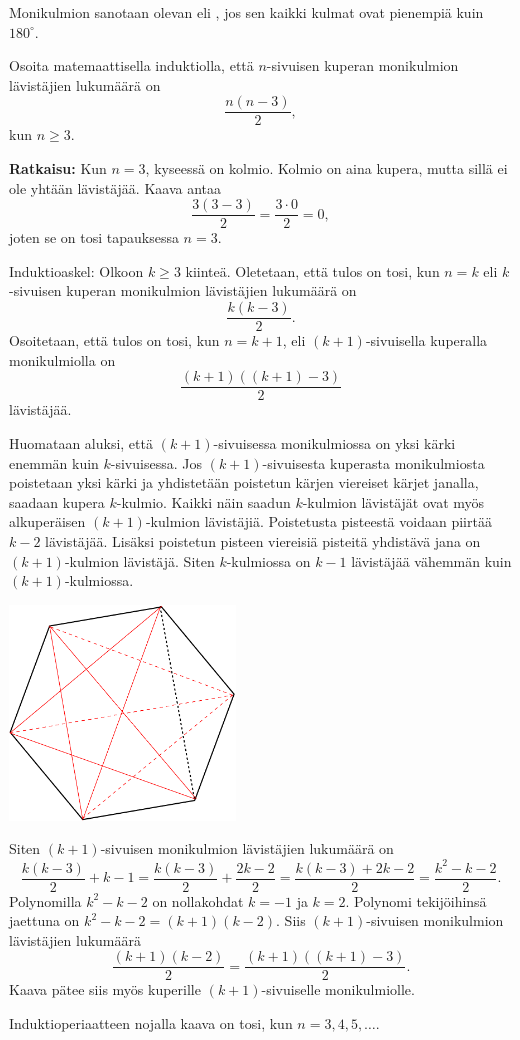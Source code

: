 \begin{esimerkki}
Monikulmion sanotaan olevan  eli , jos sen kaikki kulmat ovat pienempiä kuin $180^\circ$.

Osoita matemaattisella induktiolla, että $n$-sivuisen kuperan monikulmion lävistäjien
lukumäärä on
\[
\frac{n(n-3)}{2},
\]
kun $n\ge 3$.

{\bf Ratkaisu:}
Kun $n = 3$, kyseessä on kolmio. Kolmio on aina kupera, mutta sillä ei ole yhtään lävistäjää. Kaava antaa
\[
\frac{3(3-3)}{2}=\frac{3\cdot 0}{2} =0,
\]
joten se on tosi tapauksessa $n=3$.

Induktioaskel: Olkoon $k\ge 3$ kiinteä. Oletetaan, että tulos on tosi, kun $n=k$ eli $k$-sivuisen kuperan monikulmion lävistäjien lukumäärä on
\[
\frac{k(k-3)}{2}.
\]
Osoitetaan, että tulos on tosi, kun $n=k+1$, eli $(k+1)$-sivuisella kuperalla monikulmiolla on
\[
\frac{(k+1)((k+1)-3)}{2}
\]
lävistäjää.

Huomataan aluksi, että $(k+1)$-sivuisessa monikulmiossa on yksi kärki enemmän kuin $k$-sivuisessa. Jos $(k+1)$-sivuisesta kuperasta monikulmiosta poistetaan yksi kärki ja yhdistetään poistetun kärjen viereiset kärjet janalla, saadaan kupera $k$-kulmio. Kaikki näin saadun $k$-kulmion lävistäjät ovat myös alkuperäisen $(k+1)$-kulmion lävistäjiä.
Poistetusta pisteestä voidaan piirtää $k - 2$ lävistäjää. Lisäksi poistetun pisteen viereisiä pisteitä yhdistävä jana on $(k+1)$-kulmion lävistäjä. Siten $k$-kulmiossa on $k-1$ lävistäjää vähemmän kuin $(k+1)$-kulmiossa.

\begin{center}
\includegraphics[width=6cm]{pictures/kulmiot}
\end{center}


Siten $(k + 1)$-sivuisen monikulmion lävistäjien lukumäärä on
\[
\frac{k (k - 3)}{2} +k-1=
\frac{k (k - 3)}{2} + \frac{2k - 2}{2}
=
\frac{k (k - 3)+2k-2}{2}=\frac{k^2-k-2}{2}.
\]
Polynomilla $k^2 - k - 2$ on nollakohdat $k = -1$ ja $k = 2$. Polynomi tekijöihinsä jaettuna
on $k^2 -k -2 = (k + 1)(k- 2)$. Siis $(k + 1)$-sivuisen monikulmion lävistäjien lukumäärä
\[
\frac{(k + 1)(k - 2)}{2}= \frac{(k + 1)((k + 1)-3)}{2}.
\]
Kaava pätee siis myös kuperille $(k + 1)$-sivuiselle monikulmiolle.

Induktioperiaatteen nojalla kaava on tosi, kun $n=3, 4, 5, \ldots$.
\end{esimerkki}


